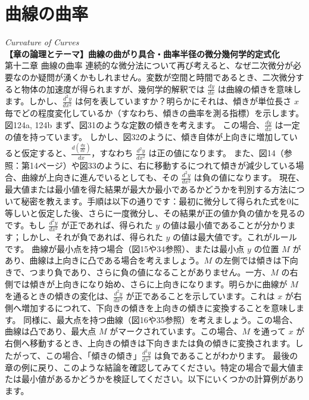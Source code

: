 \documentclass[a4paper,11pt,openany]{ltjsbook}
\begin{document}
\chapter{曲線の曲率}
\noindent\textit{\large Curvature of Curves}\\[2mm]
\noindent\textbf{\small 【章の論理とテーマ】曲線の曲がり具合・曲率半径の微分幾何学的定式化}\\[4mm]
第十二章 曲線の曲率
連続的な微分法について再び考えると、なぜ二次微分が必要なのか疑問が湧くかもしれません。変数が空間と時間であるとき、二次微分すると物体の加速度が得られますが、幾何学的解釈では \(\frac{dy}{dx}\) は曲線の傾きを意味します。しかし、\(\frac{d^2 y}{dx^2}\) は何を表していますか？明らかにそれは、傾きが単位長さ \(x\) 毎でどの程度変化しているか（すなわち、傾きの曲率を測る指標）を示します。
図124a, 124b
まず、図31のような定数の傾きを考えます。
この場合、\(\frac{dy}{dx}\) は一定の値を持っています。
しかし、図32のように、傾き自体が上向きに増加していると仮定すると、\(\frac{d\left(\frac{dy}{dx}\right)}{dx}\)，すなわち \(\frac{d^2y}{dx^2}\) は正の値になります。
また、図14（参照：第14ページ）や図33のように、右に移動するにつれて傾きが減少している場合、曲線が上向きに進んでいるとしても、その \(\frac{d^2y}{dx^2}\) は負の値になります。
現在、最大値または最小値を得た結果が最大か最小であるかどうかを判別する方法について秘密を教えます。手順は以下の通りです：最初に微分して得られた式を0に等しいと仮定した後、さらに一度微分し、その結果が正の値か負の値かを見るのです。もし \(\frac{d^2y}{dx^2}\) が正であれば、得られた \(y\) の値は最小値であることが分かります；しかし、それが負であれば、得られた \(y\) の値は最大値です。これがルールです。
曲線が最小点を持つ場合（図15や34参照）、または最小点 \( y \) の位置 \( M \) があり、曲線は上向きに凸である場合を考えましょう。\( M \) の左側では傾きは下向きで、つまり負であり、さらに負の値になることがありません。一方、\( M \) の右側では傾きが上向きになり始め、さらに上向きになります。明らかに曲線が \( M \) を通るときの傾きの変化は、\(\frac{d^2y}{dx^2}\) が正であることを示しています。これは \( x \) が右側へ増加するにつれて、下向きの傾きを上向きの傾きに変換することを意味します。
同様に、最大点を持つ曲線（図16や35参照）を考えましょう。この場合、曲線は凸であり、最大点 \( M \) がマークされています。この場合、\( M \) を通って \( x \) が右側へ移動するとき、上向きの傾きは下向きまたは負の傾きに変換されます。したがって、この場合、「傾きの傾き」\(\frac{d^2y}{dx^2}\) は負であることがわかります。
最後の章の例に戻り、このような結論を確認してみてください。特定の場合で最大値または最小値があるかどうかを検証してください。以下にいくつかの計算例があります。
\end{document}
